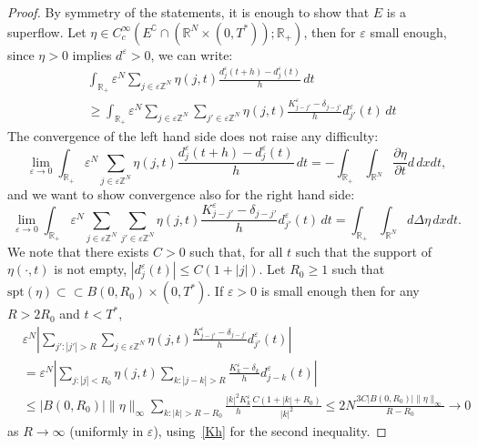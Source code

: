 \documentclass[10pt]{amsart}
\theoremstyle{plain}
\theoremstyle{definition}
\newcommand{\R}{\mathbb{R}}
\newcommand{\Z}{\mathbb{Z}}
\newcommand{\comp}[1]{{#1}^\complement}
\newcommand{\e}{\varepsilon}
\numberwithin{equation}{section}
\begin{document}
\begin{proof}
By symmetry of the statements,
it is enough to show that $E$ is a superflow. Let
$\eta\in C_c^\infty(\comp{E}\cap (\R^N\times (0,T^*));\R_+)$, then for $\e$ small enough, since $\eta>0$ implies $ d^\e>0$, we can write:
\[
\begin{split}
    &\int_{\R_+}\e^N\sum_{j\in\e\Z^N} \eta(j,t)  \frac{d^{\e}_j(t+h)-d^\e_j(t)}{h} \,dt \\
    &\ge
  \int_{\R_+}\e^N\sum_{j\in\e\Z^N} \sum_{j'\in \e\Z^N} \eta(j,t) \frac{K^\e_{j-j'}-\delta_{j-j'}}{h}d^\e_{j'}(t)
  \,dt
\end{split}
\]
The convergence of  the left hand side does not raise any difficulty:
\[
\lim_{\e\to 0}  \int_{\R_+}\e^N\sum_{j\in\e\Z^N} \eta(j,t)  \frac{d^{\e}_j(t+h)-d^\e_j(t)}{h} \,dt =  -\int_{\R_+}\int_{\R^N} \frac{\partial\eta}{\partial t} d \,dxdt,
\] 
and we want to show convergence also for the
right hand side:
\begin{equation}\label{eq:weakconvlap}
\lim_{\e\to 0}  \int_{\R_+}\e^N\sum_{j\in\e\Z^N} \sum_{j'\in \e\Z^N} \eta(j,t) \frac{K^\e_{j-j'}-\delta_{j-j'}}{h}d^\e_{j'}(t)
  \,dt
=  \int_{\R_+}\int_{\R^N} d\Delta\eta \,dxdt.
\end{equation}
We note that 
there exists $C>0$ such that, for all $t$ such that the support of $\eta(\cdot,t)$ is
not empty,
$|d_j^\e(t)|\le C(1+|j|)$. 
Let $  {R_0\ge 1}$ such that $\text{spt}(\eta)\subset\subset B(0,R_0)\times (0,T^*)$. If $\e>0$ is
small enough then for any $R>2R_0$ and $t<T^*$,
\begin{align}\label{eq:boundremainder}
  &\e^N\left|\sum_{j':|j'|>R} \sum_{j\in \e\Z^N} \eta(j,t) \frac{K^\e_{j-j'}-\delta_{j-j'}}{h}d^\e_{j'}(t)\right|
  \nonumber \\
  &=
  \e^N\left|\sum_{j: |j|<R_0}  \eta(j,t)\sum_{k:|j-k|>R}\frac{K^\e_{k}-\delta_{k}}{h}d^\e_{j-k}(t)\right|
  \\ 
  &\le |B(0,R_0)| \lVert\eta\rVert_\infty \sum_{k: |k|>R-R_0} \frac{|k|^2 K^\e_k}{h} \frac{C(1+|k|+R_0)}{|k|^2}
  \le 2N\frac{3C|B(0,R_0)|\lVert\eta\rVert_\infty}{R-R_0}\to 0\nonumber
\end{align}
as $R\to\infty$ (uniformly in $\e$), using~\eqref{Kh} for the   {second} inequality.


\end{proof}
\end{document}
